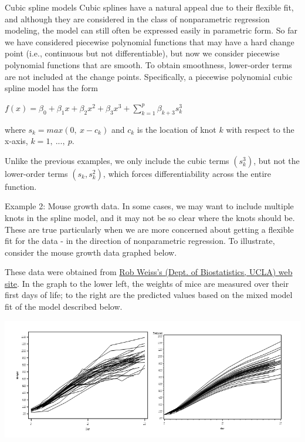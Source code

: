 \documentclass[
  9pt,
  ignorenonframetext,
]{beamer}
\begin{document}
\begin{frame}{Cubic spline models}
\protect\hypertarget{cubic-spline-models}{}
Cubic splines have a natural appeal due to their flexible fit, and
although they are considered in the class of nonparametric regression
modeling, the model can still often be expressed easily in parametric
form. So far we have considered piecewise polynomial functions that may
have a hard change point (i.e., continuous but not differentiable), but
now we consider piecewise polynomial functions that are smooth. To
obtain smoothness, lower-order terms are not included at the change
points. Specifically, a piecewise polynomial cubic spline model has the
form

\(f(x) = \beta_0 + \beta_1 x + \beta_2 x^2 + \beta_3 x^3+\sum_{k=1}^p \beta_{k+3} s_k^3\)

where \(s_k = max(0,\ x-c_k)\) and \(c_k\) is the location of knot \(k\)
with respect to the x-axis, \(k=1,\ ...,\ p\).

Unlike the previous examples, we only include the cubic terms
\((s_k^3)\), but not the lower-order terms \((s_k, s_k^2)\), which
forces differentiability across the entire function.
\end{frame}

\begin{frame}{Example 2: Mouse growth data.}
\protect\hypertarget{example-2-mouse-growth-data.}{}
In some cases, we may want to include multiple knots in the spline
model, and it may not be so clear where the knots should be. These are
true particularly when we are more concerned about getting a flexible
fit for the data - in the direction of nonparametric regression. To
illustrate, consider the mouse growth data graphed below.

These data were obtained from
\href{http://rem.ph.ucla.edu/rob/rm/examples/mice.html}{Rob Weiss's
(Dept. of Biostatistics, UCLA) web site}. In the graph to the lower
left, the weights of mice are measured over their first days of life; to
the right are the predicted values based on the mixed model fit of the
model described below.

\begin{center}\includegraphics[width=0.7\linewidth]{figs_L12/f14} \end{center}
\end{frame}
\end{document}
